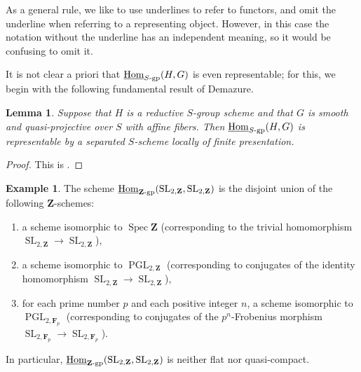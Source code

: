 \documentclass[11pt, letterpaper,english]{amsart}
\theoremstyle{plain}
\newtheorem{lemma}[lem]{Lemma}
\theoremstyle{definition}
\newtheorem{example}[lem]{Example}
\numberwithin{equation}{section}
\numberwithin{lem}{section}
\newcommand{\mathfont}{\mathbf}
\newcommand{\bF}{\mathfont{F}}
\newcommand{\bZ}{\mathfont{Z}}
\DeclareMathOperator{\Hom}{Hom}
\DeclareMathOperator{\Spec}{Spec}
\DeclareMathOperator{\SL}{SL}
\DeclareMathOperator{\PGL}{PGL}
\begin{document}
As a general rule, we like to use underlines to refer to functors, and omit the underline when referring to a representing object. However, in this case the notation without the underline has an independent meaning, so it would be confusing to omit it.

It is not clear a priori that $\underline{\Hom}_{S\textrm{-}\rm{gp}}(H, G)$ is even representable; for this, we begin with the following fundamental result of Demazure.

\begin{lemma}\label{lemma:demazure-rep}
Suppose that $H$ is a reductive $S$-group scheme and that $G$ is smooth and quasi-projective over $S$ with affine fibers. Then $\underline{\Hom}_{S\textrm{-}\rm{gp}}(H, G)$ is representable by a separated $S$-scheme locally of finite presentation.
\end{lemma}

\begin{proof}
This is \cite[Exp.\ XXIV, Corollaire 7.2.3]{sga3}.
\end{proof}

\begin{example}\cite[Exp.\ XXIV, 7.4]{sga3}\label{example:sga3-hom-scheme}
    The scheme $\underline{\Hom}_{\bZ\textrm{-}\rm{gp}}(\SL_{2, \bZ}, \SL_{2, \bZ})$ is the disjoint union of the following $\bZ$-schemes:
    \begin{enumerate}
        \item a scheme isomorphic to $\Spec \bZ$ (corresponding to the trivial homomorphism $\SL_{2, \bZ} \to \SL_{2, \bZ}$),
        \item a scheme isomorphic to $\PGL_{2, \bZ}$ (corresponding to conjugates of the identity homomorphism $\SL_{2, \bZ} \to \SL_{2, \bZ}$),
        \item for each prime number $p$ and each positive integer $n$, a scheme isomorphic to $\PGL_{2, \bF_p}$ (corresponding to conjugates of the $p^n$-Frobenius morphism $\SL_{2, \bF_p} \to \SL_{2, \bF_p}$).
    \end{enumerate}
    In particular, $\underline{\Hom}_{\bZ\textrm{-}\rm{gp}}(\SL_{2, \bZ}, \SL_{2, \bZ})$ is neither flat nor quasi-compact.
\end{example}
\end{document}
